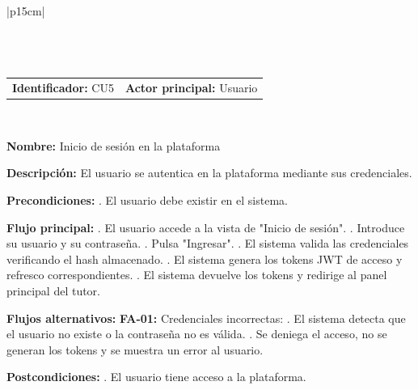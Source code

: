\begingroup
{}
\setlength{\arrayrulewidth}{1pt}
\begin{longtable}{|p{15cm}|}
  \hline
   \\
  \hline
  \endfirsthead
   \\
  \hline
   \\
  \hline
  \endhead
  \hline {} \\ \hline
  \endfoot
  \hline
  \caption{Caso de Uso CU5 — Inicio de sesión en la plataforma.}
  \label{TB:CU5_LOGIN}
  \endlastfoot

  \begin{tabularx}{\linewidth}{@{}X X@{}}
    \textbf{Identificador:} CU5 & \textbf{Actor principal:} Usuario
  \end{tabularx} \\ \hline

  \textbf{Nombre:} Inicio de sesión en la plataforma \\ \hline

  \textbf{Descripción:} \newline 
  El usuario se autentica en la plataforma mediante sus credenciales. \\ \hline

  \textbf{Precondiciones:} . El usuario debe existir en el sistema. \\ \hline

  \textbf{Flujo principal:} . El usuario accede a la vista de "Inicio de sesión". . Introduce su usuario y su contraseña. . Pulsa "Ingresar". . El sistema valida las credenciales verificando el hash almacenado. . El sistema genera los tokens JWT de acceso y refresco correspondientes. . El sistema devuelve los tokens y redirige al panel principal del tutor. \\ \hline

  \textbf{Flujos alternativos:} \newline
  \textbf{FA-01:} Credenciales incorrectas: . El sistema detecta que el usuario no existe o la contraseña no es válida. . Se deniega el acceso, no se generan los tokens y se muestra un error al usuario. \\ \hline

  \textbf{Postcondiciones:} . El usuario tiene acceso a la plataforma. \\ \hline

\end{longtable}
\endgroup
